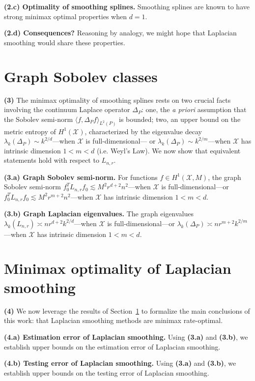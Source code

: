 \documentclass{article}
\newcommand{\1}{\mathbf{1}}
\newcommand{\Lap}{L}
\newcommand{\Xset}{\mathcal{X}}
\newcommand{\Leb}{L}
\theoremstyle{alden}
\theoremstyle{aldenthm}
\theoremstyle{definition}
\theoremstyle{remark}
\begin{document}
\textbf{(2.c) Optimality of smoothing splines.} Smoothing splines are known to have strong minimax optimal properties when $d = 1$.

\textbf{(2.d) Consequences?} Reasoning by analogy, we might hope that Laplacian smoothing would share these properties. 

\section{Graph Sobolev classes}
\label{sec:graph_sobolev_classes}

\textbf{(3)} The minimax optimality of smoothing splines rests on two crucial facts involving the continuum Laplace operator $\Delta_P$: one, the \textit{a priori} assumption that the Sobolev semi-norm $\langle f, \Delta_P f \rangle_{\Leb^2(P)}$ is bounded; two, an upper bound on the metric entropy of $H^1(\Xset)$, characterized by the eigenvalue decay $\lambda_k(\Delta_P) \sim k^{2/d}$---when $\Xset$ is full-dimensional--- or $\lambda_k(\Delta_P) \sim k^{2/m}$---when $\Xset$ has intrinsic dimension $1 < m < d$ (i.e. Weyl's Law). We now show that equivalent statements hold with respect to $\Lap_{n,r}$.

\textbf{(3.a) Graph Sobolev semi-norm.} For functions $f \in H^1(\Xset, M)$, the graph Sobolev semi-norm $f_0^T \Lap_{n,r} f_0 \lesssim M^2 r^{d + 2}n^2$---when $\Xset$ is full-dimensional---or $f_0^T \Lap_{n,r} f_0 \lesssim M^2 r^{m + 2}n^2$---when $\Xset$ has intrinsic dimension $1 < m < d$. 
 
\textbf{(3.b) Graph Laplacian eigenvalues.} The graph eigenvalues $\lambda_k(\Lap_{n,r}) \asymp n r^{d + 2}k^{2/d}$---when $\Xset$ is full-dimensional---or $\lambda_k(\Delta_P) \asymp nr^{m + 2}k^{2/m}$---when $\Xset$ has intrinsic dimension $1 < m < d$. 

\section{Minimax optimality of Laplacian smoothing}

\textbf{(4)} We now leverage the results of Section~\ref{sec:graph_sobolev_classes} to formalize the main conclusions of this work: that Laplacian smoothing methods are minimax rate-optimal.

\textbf{(4.a) Estimation error of Laplacian smoothing.} Using \textbf{(3.a)} and \textbf{(3.b)}, we establish upper bounds on the estimation error of Laplacian smoothing.

\textbf{(4.b) Testing error of Laplacian smoothing.} Using \textbf{(3.a)} and \textbf{(3.b)}, we establish upper bounds on the testing error of Laplacian smoothing.
\end{document}
